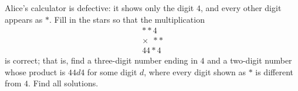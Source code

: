 Alice's calculator is defective: it shows only the digit $4$, and every other digit appears as $*$. Fill in the stars so that the multiplication
\[
\begin{array}{r}
**4\\
\times\ \ **\\
\hline
44*4
\end{array}
\]
is correct; that is, find a three-digit number ending in $4$ and a two-digit number whose product is $44d4$ for some digit $d$, where every digit shown as $*$ is different from $4$. Find all solutions.
